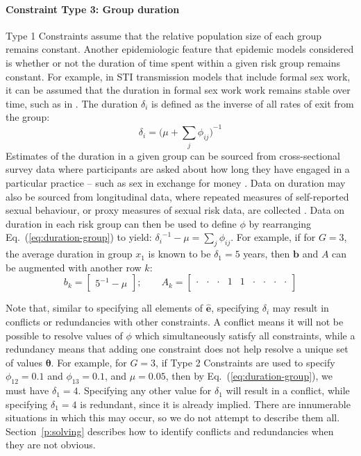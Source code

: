 \paragraph{Constraint Type 3: Group duration}
\label{con:group-dur}
Type 1 Constraints assume that the relative population size of each group remains constant.
Another epidemiologic feature that epidemic models considered
is whether or not the duration of time spent within a given risk group remains constant.
For example, in STI transmission models that include formal sex work,
it can be assumed that the duration in formal sex work work remains stable over time,
such as in \citep{Mishra2014a,Boily2015}.
The duration $\delta_i$ is defined as the inverse of all rates of exit from the group:
\begin{equation}\label{eq:duration-group}
\delta_i = {\bigg(\mu + \sum_{j}{\phi_{ij}}\bigg)}^{-1}
\end{equation}
Estimates of the duration in a given group can be sourced from
cross-sectional survey data where participants are asked about
how long they have engaged in a particular practice
-- such as sex in exchange for money \citep{Watts2010}.
Data on duration may also be sourced from longitudinal data,
where repeated measures of self-reported sexual behaviour,
or proxy measures of sexual risk data,
are collected \citep{DHS,PHIAproject}.
Data on duration in each risk group can then be used to define $\phi$ by
rearranging Eq.~(\ref{eq:duration-group}) to yield:
${\delta_{i}}^{-1} - \mu = \sum_{j}{\phi_{ij}}$.
For example, if for $G = 3$,
the average duration in group $x_1$ is known to be $\delta_1 = 5$ years,
then $\bm{b}$ and $A$ can be augmented with another row $k$:
\begin{equation}\label{eq:eg-dur}
b_k = \left[\begin{array}{c}
{5}^{-1} - \mu
\end{array}\right];\qquad
A_k = \left[\begin{array}{ccccccccc}
\cdot & \cdot & \cdot & 1 & 1 & \cdot & \cdot & \cdot & \cdot \\
\end{array}\right]
\end{equation}
\par
Note that, similar to specifying all elements of $\bm{\hat{e}}$,
specifying $\delta_i$ may result in conflicts or redundancies with other constraints.
A conflict means it will not be possible to resolve values of $\phi$
which simultaneously satisfy all constraints, while
a redundancy means that adding one constraint does not help resolve
a unique set of values $\bm{\theta}$.
For example, for $G = 3$,
if Type 2 Constraints are used to specify $\phi_{12} = 0.1$ and $\phi_{13} = 0.1$,
and $\mu = 0.05$, then by Eq.~(\ref{eq:duration-group}), we must have
$\delta_1 = 4$.
Specifying any other value for $\delta_1$ will result in a conflict,
while specifying $\delta_1 = 4$ is redundant,
since it is already implied.
There are innumerable situations in which this may occur,
so we do not attempt to describe them all.
Section~\ref{p:solving} describes how to identify
conflicts and redundancies when they are not obvious.
